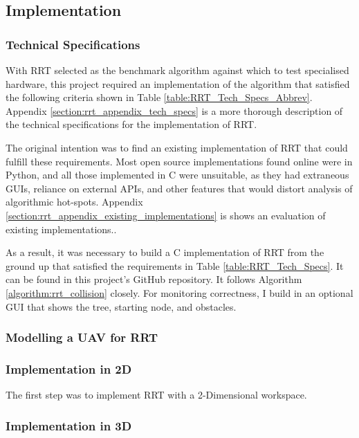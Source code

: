         

\newpage

\subsection{Implementation}\label{section:implementation}
    
    \subsubsection{Technical Specifications}

        With \gls{RRT} selected as the benchmark algorithm against which to test specialised hardware, this project required an implementation of the algorithm that satisfied the following criteria shown in Table \ref{table:RRT_Tech_Specs_Abbrev}. Appendix \ref{section:rrt_appendix_tech_specs} is a more thorough description of the technical specifications for the implementation of RRT. 

        

        The original intention was to find an existing implementation of RRT that could fulfill these requirements. Most open source implementations found online were in Python, and all those implemented in C were unsuitable, as they had extraneous \gls{GUI}s, reliance on external \gls{API}s, and other features that would distort analysis of algorithmic hot-spots. Appendix \ref{section:rrt_appendix_existing_implementations} is shows an evaluation of existing implementations.\cite{RoboJackets2019}\cite{Planning2019}\cite{Sourishg2017}\cite{Vss2sn2019}.

        As a result, it was necessary to build a C implementation of RRT from the ground up that satisfied the requirements in Table \ref{table:RRT_Tech_Specs}. It can be found in this project's GitHub repository. It follows Algorithm \ref{algorithm:rrt_collision} closely. For monitoring correctness, I build in an optional \gls{GUI} that shows the tree, starting node, and obstacles.

    \subsubsection*{Modelling a \gls{UAV} for RRT}

    \subsubsection{Implementation in 2D}
    The first step was to implement RRT with a 2-Dimensional workspace. 
    

    \subsubsection{Implementation in 3D}
    
